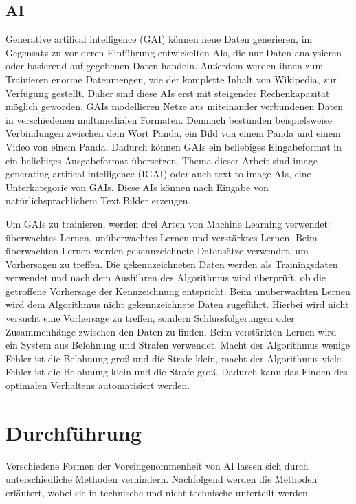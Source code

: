 \documentclass[12pt]{report}
\begin{document}
\section{AI}\label{def_ai}
Generative artifical intelligence (GAI) können neue Daten generieren, im Gegensatz zu vor deren Einführung entwickelten AIs, die nur Daten analysieren oder basierend auf gegebenen Daten handeln. Außerdem werden ihnen zum Trainieren enorme Datenmengen, 
wie der komplette Inhalt von Wikipedia, zur Verfügung gestellt. Daher sind diese AIs erst mit steigender Rechenkapazität möglich geworden. GAIs modellieren Netze aus miteinander verbundenen Daten in verschiedenen multimedialen Formaten. Demnach 
bestünden beispielsweise Verbindungen zwischen dem Wort Panda, ein Bild von einem Panda und einem Video von einem Panda. Dadurch können GAIs ein beliebiges Eingabeformat in ein beliebiges Ausgabeformat übersetzen. Thema dieser Arbeit sind image generating 
artifical intelligence (IGAI) oder auch text-to-image AIs, eine Unterkategorie von GAIs. Diese AIs können nach Eingabe von natürlichsprachlichem Text Bilder erzeugen.
\cite{Roberto}

Um GAIs zu trainieren, werden drei Arten von Machine Learning verwendet: überwachtes Lernen, unüberwachtes Lernen und verstärktes Lernen. 
Beim überwachten Lernen werden gekennzeichnete Datensätze verwendet, um Vorhersagen zu treffen. Die gekennzeichneten Daten werden als Trainingsdaten verwendet und nach dem Ausführen des Algorithmus wird überprüft, ob die getroffene Vorhersage der Kennzeichnung entspricht.
Beim unüberwachten Lernen wird dem Algorithmus nicht gekennzeichnete Daten zugeführt. Hierbei wird nicht versucht eine Vorhersage zu treffen, sondern Schlussfolgerungen oder Zusammenhänge zwischen den Daten zu finden.
Beim verstärkten Lernen wird ein System aus Belohnung und Strafen verwendet. Macht der Algorithmus wenige Fehler ist die Belohnung groß und die Strafe klein, macht der Algorithmus viele Fehler ist die Belohnung klein und die Strafe groß. Dadurch kann das Finden des 
optimalen Verhaltens automatisiert werden.
\cite{serafeim}

\chapter{Durchführung}
Verschiedene Formen der Voreingenommenheit von AI lassen sich durch unterschiedliche Methoden verhindern. Nachfolgend werden die Methoden erläutert, wobei sie in technische und nicht-technische unterteilt werden.
\end{document}
